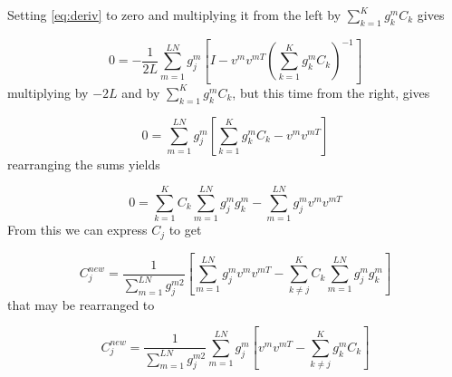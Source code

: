\documentclass{paper}
\begin{document}
Setting  \ref{eq:deriv} to zero and multiplying it from the left by $\sum_{k=1}^K g_k^m C_k$ gives

\begin{equation}\label{eq:zero}
0 =  -\frac{1}{2L} \sum_{m=1}^{LN}  g_j^m \left[ I -  v^m v^{mT} \left( \sum_{k=1}^K g_k^m C_k \right)^{-1} \right]
\end{equation}
%
multiplying by $-2L$ and by $\sum_{k=1}^K g_k^m C_k$, but this time from the right, gives

\begin{equation}
0 = \sum_{m=1}^{LN} g_j^m \left[ \sum_{k=1}^K g_k^m C_k - v^m v^{mT} \right]
\end{equation}
%
rearranging the sums yields

\begin{equation}
0 =  \sum_{k=1}^K C_k \sum_{m=1}^{LN} g_j^m g_k^m  - \sum_{m=1}^{LN} g_j^m v^m v^{mT}
\end{equation}
%
From this we can express $C_j$ to get

\begin{equation}
C_j^{new} = \frac{1}{\sum_{m=1}^{LN} g_j^{m2}} \left[ \sum_{m=1}^{LN} g_j^m v^m v^{mT} - \sum_{k \neq j}^K C_k \sum_{m=1}^{LN} g_j^m g_k^m \right]
\end{equation}
%
that may be rearranged to

\begin{equation}
C_j^{new} = \frac{1}{\sum_{m=1}^{LN} g_j^{m2}} \sum_{m=1}^{LN} g_j^m \left[ v^m v^{mT} - \sum_{k \neq j}^K g_k^m C_k \right]
\end{equation}
\end{document}
